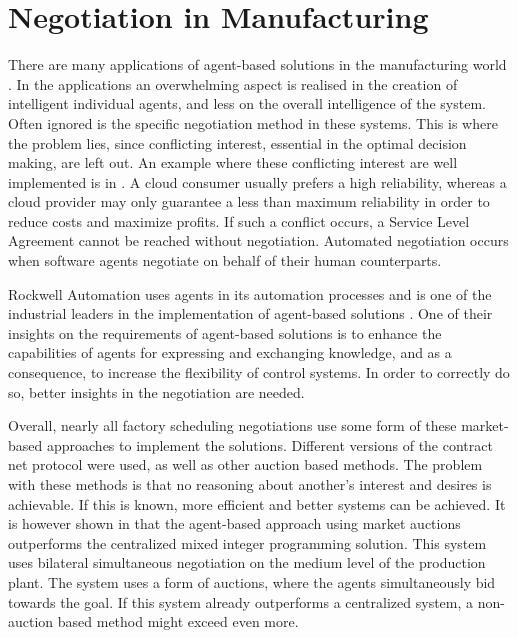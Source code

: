 \section{Negotiation in Manufacturing}
There are many applications of agent-based solutions in the manufacturing world \citep{monostori2006agent}. In the applications an overwhelming aspect is realised in the creation of intelligent individual agents, and less on the overall intelligence of the system. Often ignored is the specific negotiation method in these systems. This is where the problem lies, since conflicting interest, essential in the optimal decision making, are left out. An example where these conflicting interest are well implemented is in \citep{zheng2014cloud}. A cloud consumer usually prefers a high reliability, whereas a cloud provider may only guarantee a less than maximum reliability in order to reduce costs and maximize profits. If such a conflict occurs, a Service Level Agreement cannot be reached without negotiation. Automated negotiation occurs when software agents negotiate on behalf of their human counterparts.  


Rockwell Automation uses agents in its automation processes and is one of the industrial leaders in the implementation of agent-based solutions \citep{vrba2011rockwell}. One of their insights on the requirements of agent-based solutions is to enhance the capabilities of agents for expressing and exchanging knowledge, and as a consequence, to increase the flexibility of control systems. In order to correctly do so, better insights in the negotiation are needed.

Overall, nearly all factory scheduling negotiations use some form of these market-based approaches \citep{monostori2006agent} to implement the solutions. Different versions of the contract net protocol were used, as well as other auction based methods. The problem with these methods is that no reasoning about another's interest and desires is achievable. If this is known, more efficient and better systems can be achieved. It is however shown in \citep{bruccoleri2005production} that the agent-based approach using market auctions outperforms the centralized mixed integer programming solution. This system uses bilateral simultaneous negotiation on the medium level of the production plant. The system uses a form of auctions, where the agents simultaneously bid towards the goal. If this system already outperforms a centralized system, a non-auction based method might exceed even more.

